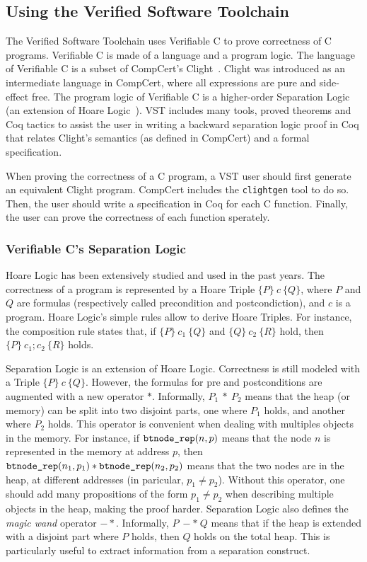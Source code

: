 \subsection{Using the Verified Software Toolchain}
The Verified Software Toolchain uses Verifiable C to prove correctness of C programs.
Verifiable C is made of a language and a program logic.
The language of Verifiable C is a subset of CompCert's Clight~\cite{clight}.
Clight was introduced as an intermediate language in CompCert, where all expressions are pure and side-effect free.
The program logic of Verifiable C is a higher-order Separation Logic~\cite{sep} (an extension of Hoare Logic~\cite{hoare}).
VST includes many tools, proved theorems and Coq tactics to assist the user in writing a backward separation logic proof in Coq that relates Clight's semantics (as defined in CompCert) and a formal specification.

When proving the correctness of a C program, a VST user should first generate an equivalent Clight program.
CompCert includes the \texttt{clightgen} tool to do so. Then, the user should write a specification in Coq for each C function.
Finally, the user can prove the correctness of each function sperately.

\subsubsection{Verifiable C's Separation Logic}
Hoare Logic has been extensively studied and used in the past years.
The correctness of a program is represented by a Hoare Triple $\{P\}~c~\{Q\}$, where $P$ and $Q$ are formulas (respectively called precondition and postcondiction), and $c$ is a program.
Hoare Logic's simple rules allow to derive Hoare Triples. For instance, the composition rule states that, if $\{P\}~c_1~\{Q\}$ and $\{Q\}~c_2~\{R\}$ hold, then $\{P\}~c_1;c_2~\{R\}$ holds.

Separation Logic is an extension of Hoare Logic. Correctness is still modeled with a Triple $\{P\}~c~\{Q\}$. However, the formulas for pre and postconditions are augmented with a new operator $*$.
Informally, $P_1~*~P_2$ means that the heap (or memory) can be split into two disjoint parts, one where $P_1$ holds, and another where $P_2$ holds.
This operator is convenient when dealing with multiples objects in the memory.
For instance, if $\texttt{btnode\_rep}(n,p)$ means that the node $n$ is represented in the memory at address $p$, then $\texttt{btnode\_rep}(n_1,p_1)*\texttt{btnode\_rep}(n_2,p_2)$ means that the two nodes are in the heap, at different addresses (in paricular, $p_1\neq p_2$).
Without this operator, one should add many propositions of the form $p_1\neq p_2$ when describing multiple objects in the heap, making the proof harder.
Separation Logic also defines the \textit{magic wand} operator $-*$. Informally, $P~-*~Q$ means that if the heap is extended with a disjoint part where $P$ holds, then $Q$ holds on the total heap.
This is particularly useful to extract information from a separation construct. 

